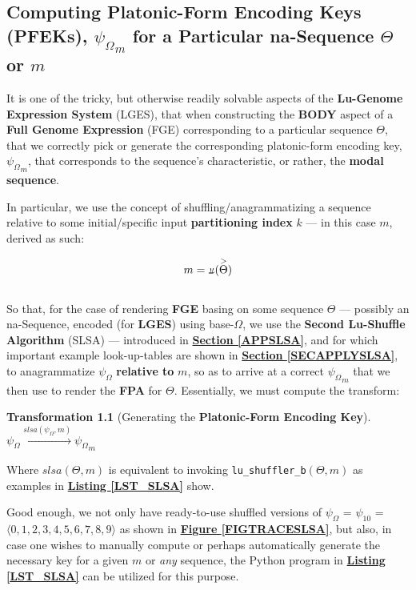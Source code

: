 \documentclass[a4paper, 18pt]{book} %
\newtheorem{trans}{Transformation}
\newcommand{\invpi}{\rotatebox[origin=c]{180}{$\pi$}}
\begin{document}
\begin{appendices}
\chapter{Computing Platonic-Form Encoding Keys (PFEKs), $\boxed{\psi_\Omega}_m$ for a Particular na-Sequence $\Theta$ or $m$}
\label{SECIFAMSSPFMAPS}


It is one of the tricky, but otherwise readily solvable aspects of the \textbf{Lu-Genome Expression System} (LGES), that when constructing the \textbf{BODY} aspect of a \textbf{Full Genome Expression} (FGE) corresponding to a particular sequence $\Theta$, that we correctly pick or generate the corresponding platonic-form encoding key, $\boxed{\psi_\Omega}_m$, that corresponds to the sequence's characteristic, or rather, the \textbf{modal sequence}. 


In particular, we use the concept of shuffling/anagrammatizing a sequence relative to some initial/specific input \textbf{partitioning index} $k$ --- in this case $m$, derived as such:

\begin{equation}
 m = \invpi(\overset{>}{\Theta})
\end{equation}\\

So that, for the case of rendering \textbf{FGE} basing on some sequence $\Theta$ --- possibly an na-Sequence, encoded (for \textbf{LGES}) using base-$\Omega$, we use the \textbf{Second Lu-Shuffle Algorithm} (SLSA) --- introduced in \textbf{\hyperref[APPSLSA]{Section \ref{APPSLSA}}}, and for which important example look-up-tables are shown in \textbf{\hyperref[SECAPPLYSLSA]{Section \ref{SECAPPLYSLSA}}}, to anagrammatize $\psi_\Omega$ \textbf{relative to} $m$, so as to arrive at a correct $\boxed{\psi_\Omega}_m$ that we then use to render the \textbf{FPA} for $\Theta$. Essentially, we must compute the transform:\\


\begin{trans}[Generating the \textbf{Platonic-Form Encoding Key}]
$ $\\
$\psi_\Omega \xrightarrow{slsa(\psi_\Omega, m)} \boxed{\psi_\Omega}_m$\\
\end{trans}
 
Where $slsa(\Theta,m)$ is equivalent to invoking \texttt{lu\_shuffler\_b$(\Theta,m)$} as examples in \textbf{\hyperref[LST_SLSA]{Listing \ref{LST_SLSA}}} show. 

Good enough, we not only have ready-to-use shuffled versions of $\psi_\Omega$ = $\psi_{10}$ = $\langle 0, 1, 2, 3, 4, 5, 6, 7, 8, 9 \rangle$ as shown in \textbf{\hyperref[FIGTRACESLSA]{Figure \ref{FIGTRACESLSA}}}, but also, in case one wishes to manually compute or perhaps automatically generate the necessary key for a given $m$ or \textit{any} sequence, the Python program in \textbf{\hyperref[LST_SLSA]{Listing \ref{LST_SLSA}}} can be utilized for this purpose.
 


\end{appendices}
\end{document}
